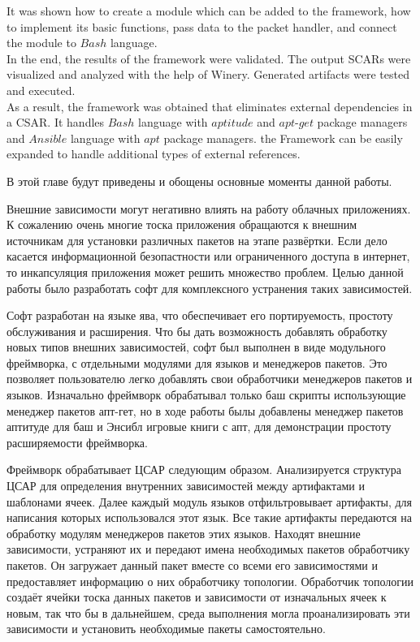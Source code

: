 It  was shown how to create a module which can be added to the framework, how to implement its basic functions, pass data to the packet handler, and connect the module to $Bash$ language. \\
In the end, the results of the framework were validated.
The output SCARs were visualized and analyzed with the help of Winery.
Generated artifacts were tested and executed.\\
As a result, the framework was obtained that eliminates external dependencies in a CSAR.
It handles $Bash$ language with $aptitude$ and $apt$-$get$ package managers and $Ansible$ language with $apt$ package managers.
the Framework can be easily expanded to handle additional types of external references. 

В этой главе будут приведены и обощены основные моменты данной работы.

Внешние зависимости могут негативно влиять на работу облачных приложениях.
К сожалению очень многие тоска приложения обращаются к внешним источникам для установки различных пакетов на этапе развёртки.
Если дело касается информационной безопастности или ограниченного доступа в интернет, то инкапсуляция приложения может решить множество проблем.
Целью данной работы было разработать софт для комплексного устранения таких зависимостей.

Софт разработан на языке ява, что обеспечивает его портируемость, простоту обслуживания и расширения.
Что бы дать возможность добавлять обработку новых типов внешних зависимостей, софт был выполнен в виде модульного фреймворка, с отдельными модулями для языков и менеджеров пакетов.
Это позволяет пользователю легко добавлять свои обработчики менеджеров пакетов и языков.
Изначально фреймворк обрабатывал только баш скрипты использующие менеджер пакетов апт-гет, но в ходе работы былы добавлены менеджер пакетов аптитуде для баш и Энсибл игровые книги с апт, для демонстрации простоту расширяемости фреймворка. 

Фреймворк обрабатывает ЦСАР следующим образом. 
Анализируется структура ЦСАР для определения внутренних зависимостей между артифактами и шаблонами ячеек.
Далее каждый модуль языков отфильтровывает артифакты, для написания которых использовался этот язык.
Все такие артифакты передаются на обработку модулям менеджеров пакетов этих языков. 
Находят внешние зависимости, устраняют их и передают имена необходимых пакетов обработчику пакетов.
Он загружает данный пакет вместе со всеми его зависимостями и предоставляет информацию о них обработчику топологии.
Обработчик топологии создаёт ячейки тоска данных пакетов и зависимости от изначальных ячеек к новым, так что бы в дальнейшем, среда выполнения могла проанализировать эти зависимости и установить необходимые пакеты самостоятельно.

